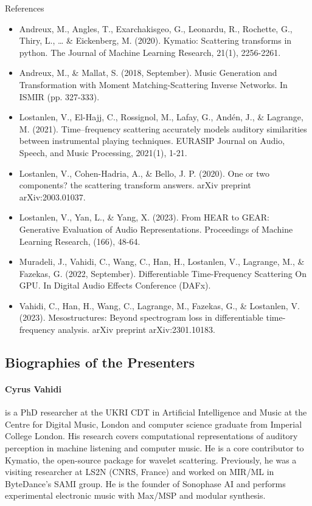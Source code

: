 References
\begin{itemize}
\item Andreux, M., Angles, T., Exarchakisgeo, G., Leonardu, R., Rochette, G., Thiry, L., … \& Eickenberg, M. (2020). Kymatio: Scattering transforms in python. The Journal of Machine Learning Research, 21(1), 2256-2261.
\item Andreux, M., \& Mallat, S. (2018, September). Music Generation and Transformation with Moment Matching-Scattering Inverse Networks. In ISMIR (pp. 327-333).
\item Lostanlen, V., El-Hajj, C., Rossignol, M., Lafay, G., Andén, J., \& Lagrange, M. (2021). Time–frequency scattering accurately models auditory similarities between instrumental playing techniques. EURASIP Journal on Audio, Speech, and Music Processing, 2021(1), 1-21.
\item Lostanlen, V., Cohen-Hadria, A., \& Bello, J. P. (2020). One or two components? the scattering transform answers. arXiv preprint arXiv:2003.01037.
\item Lostanlen, V., Yan, L., \& Yang, X. (2023). From HEAR to GEAR: Generative Evaluation of Audio Representations. Proceedings of Machine Learning Research, (166), 48-64.
\item Muradeli, J., Vahidi, C., Wang, C., Han, H., Lostanlen, V., Lagrange, M., \& Fazekas, G. (2022, September). Differentiable Time-Frequency Scattering On GPU. In Digital Audio Effects Conference (DAFx).
\item Vahidi, C., Han, H., Wang, C., Lagrange, M., Fazekas, G., \& Lostanlen, V. (2023). Mesostructures: Beyond spectrogram loss in differentiable time-frequency analysis. arXiv preprint arXiv:2301.10183.
\end{itemize}

\subsection*{Biographies of the Presenters}
\paragraph{Cyrus Vahidi} is a PhD researcher at the UKRI CDT in Artificial Intelligence and Music at the Centre for Digital Music, London and computer science graduate from Imperial College London. His research covers computational representations of auditory perception in machine listening and computer music. He is a core contributor to Kymatio, the open-source package for wavelet scattering. Previously, he was a visiting researcher at LS2N (CNRS, France) and worked on MIR/ML in ByteDance's SAMI group. He is the founder of Sonophase AI and performs experimental electronic music with Max/MSP and modular synthesis.

